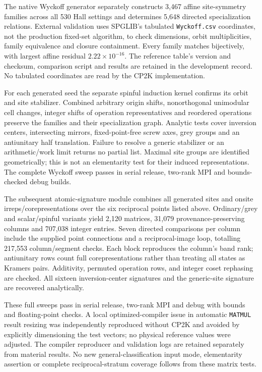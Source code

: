 \documentclass[11pt]{article}
\begin{document}
The native Wyckoff generator separately constructs 3,467 affine
site-symmetry families across all 530 Hall settings and determines
5,648 directed specialization relations. External validation uses
SPGLIB's tabulated \texttt{Wyckoff.csv} coordinates, not the production
fixed-set algorithm, to check dimensions, orbit multiplicities,
family equivalence and closure containment. Every family matches
bijectively, with largest affine residual $2.22\times10^{-16}$.
The reference table's version and checksum, comparison script and
results are retained in the development record. No tabulated
coordinates are read by the CP2K implementation.

For each generated seed the separate spinful induction kernel
confirms its orbit and site stabilizer. Combined arbitrary origin
shifts, nonorthogonal unimodular cell changes, integer shifts of
operation representatives and reordered operations preserve the
families and their specialization graph. Analytic tests cover
inversion centers, intersecting mirrors, fixed-point-free screw
axes, grey groups and an antiunitary half translation. Failure to
resolve a generic stabilizer or an arithmetic/work limit returns
no partial list. Maximal site groups are identified geometrically;
this is not an elementarity test for their induced representations.
The complete Wyckoff sweep passes in serial release, two-rank MPI
and bounds-checked debug builds.

The subsequent atomic-signature module combines all generated sites
and onsite irreps/corepresentations over the six reciprocal points
listed above. Ordinary/grey and scalar/spinful variants yield 2,120
matrices, 31,079 provenance-preserving columns and 707,038 integer
entries. Seven directed comparisons per column include the supplied
point connections and a reciprocal-image loop, totalling 217,553
column/segment checks. Each block reproduces the column's band rank;
antiunitary rows count full corepresentations rather than treating all
states as Kramers pairs. Additivity, permuted operation rows, and
integer coset rephasing are checked. All sixteen inversion-center
signatures and the generic-site signature are recovered analytically.

These full sweeps pass in serial release, two-rank MPI and debug with
bounds and floating-point checks. A local optimized-compiler issue in automatic
\texttt{MATMUL} result resizing was independently reproduced without
CP2K and avoided by explicitly dimensioning the test vectors; no
physical reference values were adjusted. The compiler reproducer and
validation logs are retained separately from material results.
No new general-classification input mode, elementarity assertion or
complete reciprocal-stratum coverage follows from these matrix tests.
\end{document}
